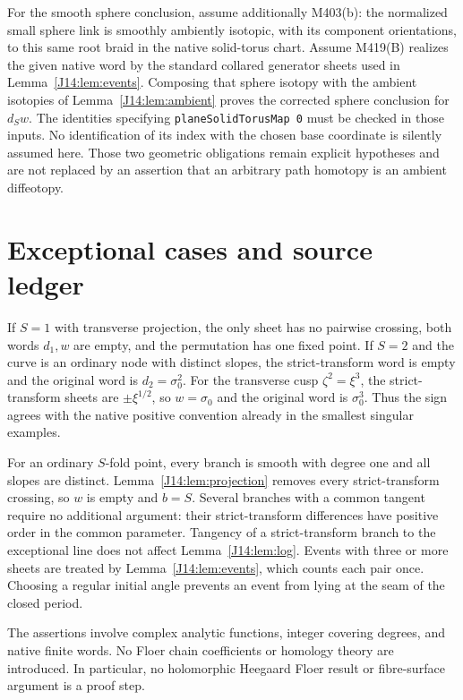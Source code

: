 \documentclass[11pt,oneside]{report}
\theoremstyle{definition}
\numberwithin{equation}{section}
\newcommand{\decl}[1]{\textnormal{\nolinkurl{#1}}}
\begin{document}
For the smooth sphere conclusion, assume additionally M403(b): the normalized
small sphere link is smoothly ambiently isotopic, with its component
orientations, to this same root braid in the native solid-torus chart.
Assume M419(B) realizes the given native word by the standard collared
generator sheets used in Lemma~\ref{J14:lem:events}.
Composing that sphere isotopy with the ambient isotopies of
Lemma~\ref{J14:lem:ambient} proves the corrected sphere conclusion for $d_Sw$.
The identities specifying \decl{planeSolidTorusMap 0} must be checked in
those inputs. No identification of its index with the chosen base coordinate
is silently assumed here. Those two geometric obligations remain explicit
hypotheses and are not replaced by an assertion that an arbitrary path
homotopy is an ambient diffeotopy.

\section{Exceptional cases and source ledger}

If $S=1$ with transverse projection, the only sheet has no pairwise
crossing, both words $d_1,w$ are empty, and the permutation has one fixed
point. If $S=2$ and the curve is an ordinary node with distinct slopes,
the strict-transform word is empty and the original word is
$d_2=\sigma_0^2$. For the transverse cusp
$\zeta^2=\xi^3$, the strict-transform sheets are
$\pm\xi^{1/2}$, so $w=\sigma_0$ and the original word is
$\sigma_0^3$. Thus the sign agrees with the native positive convention
already in the smallest singular examples.

For an ordinary $S$-fold point, every branch is smooth with degree one and
all slopes are distinct. Lemma~\ref{J14:lem:projection} removes every
strict-transform crossing, so $w$ is empty and $b=S$.
Several branches with a common tangent require no additional argument:
their strict-transform differences have positive order in the common
parameter. Tangency of a strict-transform branch to the exceptional line
does not affect Lemma~\ref{J14:lem:log}.
Events with three or more sheets are treated by Lemma~\ref{J14:lem:events},
which counts each pair once. Choosing a regular initial angle prevents an
event from lying at the seam of the closed period.

The assertions involve complex analytic functions, integer covering degrees,
and native finite words. No Floer chain coefficients or homology theory are
introduced. In particular, no holomorphic Heegaard Floer result or
fibre-surface argument is a proof step.
\end{document}
